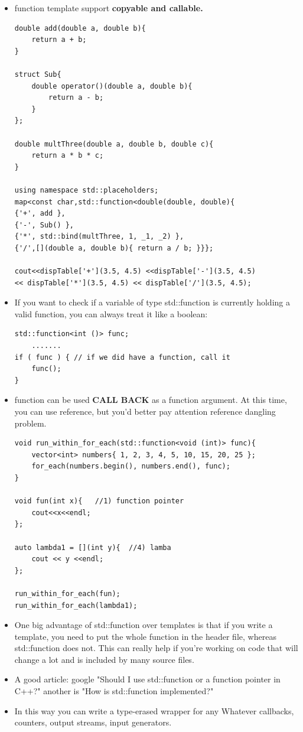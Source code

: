 \documentclass[a4paper,11pt,twoside]{book}
\begin{document}
\begin{itemize}
	\item function template support \textbf{copyable and callable.}
\begin{lstlisting}[numbers=none]
double add(double a, double b){
	return a + b;
}
	
struct Sub{
	double operator()(double a, double b){
		return a - b;
	}
};
	
double multThree(double a, double b, double c){
	return a * b * c;
}
	
using namespace std::placeholders;
map<const char,std::function<double(double, double){
{'+', add },                                         
{'-', Sub() },                                      
{'*', std::bind(multThree, 1, _1, _2) },             
{'/',[](double a, double b){ return a / b; }}};      

cout<<dispTable['+'](3.5, 4.5) <<dispTable['-'](3.5, 4.5) 
<< dispTable['*'](3.5, 4.5) << dispTable['/'](3.5, 4.5);
\end{lstlisting}
	
	\item If you want to check if a variable of type std::function is currently holding a valid function, you can always treat it like a boolean:
\begin{lstlisting}[numbers=none]
std::function<int ()> func;
	.......
if ( func ) { // if we did have a function, call it
	func();
}
\end{lstlisting}
	
	\item function can be used \textbf{CALL BACK} as a function argument. At this time, you can use reference, but you'd better pay attention reference dangling problem. 
	
\begin{lstlisting}[numbers=none]
void run_within_for_each(std::function<void (int)> func){
	vector<int> numbers{ 1, 2, 3, 4, 5, 10, 15, 20, 25 };
	for_each(numbers.begin(), numbers.end(), func);
}
	
void fun(int x){   //1) function pointer
	cout<<x<<endl;
};
	
auto lambda1 = [](int y){  //4) lamba
	cout << y <<endl;
};
	
run_within_for_each(fun);
run_within_for_each(lambda1);
\end{lstlisting}
	
	\item One big advantage of std::function over templates is that if you write a template, you need to put the whole function in the header file, whereas std::function does not. This can really help if you're working on code that will change a lot and is included by many source files.
	
	\item A good article: google "Should I use std::function or a function pointer in C++?" another is "How is std::function implemented?"
	
	
	\item In this way you can write a type-erased wrapper for any Whatever callbacks, counters, output streams, input generators.
	
\end{itemize}
\end{document}
